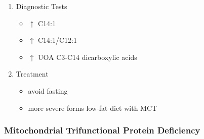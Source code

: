 \documentclass[12pt]{scrartcl}
\begin{document}
\begin{enumerate}
\item Diagnostic Tests
\label{sec:org4281c48}
\begin{itemize}
\item \(\uparrow\) C14:1
\item \(\uparrow\) C14:1/C12:1
\item \(\uparrow\) UOA C3-C14 dicarboxylic acids
\end{itemize}
\item Treatment
\label{sec:org2cc1af5}
\begin{itemize}
\item avoid fasting
\item more severe forms low-fat diet with MCT
\end{itemize}
\end{enumerate}

\subsubsection{Mitochondrial Trifunctional Protein Deficiency}
\label{sec:org8592eba}
\end{document}
